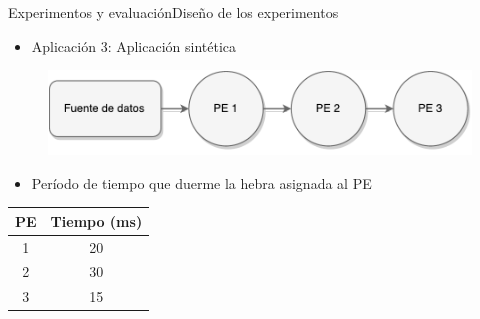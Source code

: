 \begin{frame}{Experimentos y evaluación}{Diseño de los experimentos}
\begin{itemize}
	\item Aplicación 3: Aplicación sintética
\end{itemize}
\begin{figure}[!ht]
	\centering
		\includegraphics[scale=0.65]{images/App3.pdf}
\end{figure}
\begin{itemize}
	\item Período de tiempo que duerme la hebra asignada al PE
\end{itemize}
\begin{table}[!ht]
\footnotesize
\centering
\begin{tabular}{| c | c |}
\hline
PE & Tiempo (ms) \\ \hline
1 & 20 \\
2 & 30 \\
3 & 15 \\\hline
\end{tabular}
\end{table}
\end{frame}

